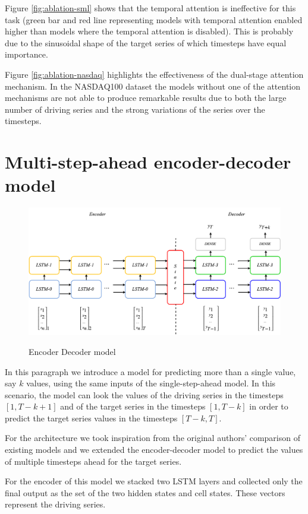 \documentclass{article}
\begin{document}
Figure \ref{fig:ablation-sml} shows that the temporal attention is
ineffective for this task (green bar and red line representing
models with temporal attention enabled higher than models
where the temporal attention is disabled). This is probably due to the
sinusoidal shape of the target series of which timesteps have equal
importance.

Figure \ref{fig:ablation-nasdaq} highlights the effectiveness of the
dual-stage attention mechanism. In the NASDAQ100 dataset the models
without one of the attention mechanisms are not able to produce
remarkable results due to both the large number of driving series and
the strong variations of the series over the timesteps.

\section{Multi-step-ahead encoder-decoder model}

\begin{figure}[ht]
\centering
\includegraphics[width=0.9\linewidth]{ende-rnn.png} \\
\caption{Encoder Decoder model}
\label{fig:ende-rnn}
\end{figure}


In this paragraph we introduce a model for predicting more than a single value,
say $k$ values, using the same inputs of the single-step-ahead model.
In this scenario, the model can look the values of the driving series
in the timesteps $[1, T - k + 1]$ and of the
target series in the timesteps $[1, T - k]$ in order to predict the target
series values in the timesteps $[T - k, T]$.

For the architecture we took inspiration from the original authors' comparison
of
existing models and we extended the encoder-decoder model to predict the values
of multiple timesteps ahead for the target series.

For the encoder of this model we stacked two LSTM layers and collected only the
final output as the set of the two hidden states and cell states. These vectors
represent the driving series.
\end{document}
